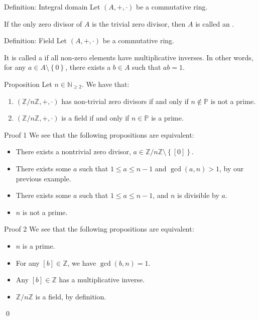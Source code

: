 \documentclass[a4paper]{article}
\begin{document}
\begin{parag}{Definition: Integral domain}
    Let $\left(A, +, \cdot \right)$ be a commutative ring.

    If the only zero divisor of $A$ is the trivial zero divisor, then $A$ is called an .
\end{parag}

\begin{parag}{Definition: Field}
    Let $\left(A, +, \cdot \right)$ be a commutative ring.

    It is called a  if all non-zero elements have multiplicative inverses. In other words, for any $a \in A \setminus \left\{0\right\}$, there exists a $b \in A$ such that $ab = 1$.
\end{parag}

\begin{parag}{Proposition}
    Let $n \in \mathbb{N}_{\geq 2}$. We have that:
    \begin{enumerate}
        \item $\left(\mathbb{Z}/n\mathbb{Z}, +, \cdot \right)$ has non-trivial zero divisors if and only if $n \not \in \mathbb{P}$ is not a prime.
        \item $\left(\mathbb{Z}/n\mathbb{Z}, +, \cdot \right)$ is a field if and only if $n \in \mathbb{P}$ is a prime.
    \end{enumerate}

    \begin{subparag}{Proof 1}
        We see that the following propositions are equivalent:
        \begin{itemize}
            \item There exists a nontrivial zero divisor, $a \in \mathbb{Z}/n\mathbb{Z} \setminus \left\{\left[0\right]\right\}$.
            \item There exists some $a$ such that $1 \leq a \leq n-1$ and $\gcd\left(a, n\right) > 1$, by our previous example.
            \item There exists some $a$ such that $1 \leq a \leq n-1$, and $n$ is divisible by $a$.
            \item $n$ is not a prime.
        \end{itemize}
    \end{subparag} 

    \begin{subparag}{Proof 2}
        We see that the following propositions are equivalent:
        \begin{itemize}
            \item $n$ is a prime.
            \item For any $\left[b\right] \in \mathbb{Z}$, we have $\gcd\left(b, n\right) = 1$.
            \item Any $\left[b\right] \in \mathbb{Z}$ has a multiplicative inverse.
            \item $\mathbb{Z}/n\mathbb{Z}$ is a field, by definition. 
        \end{itemize}

        \qed
    \end{subparag}
\end{parag}
\end{document}
